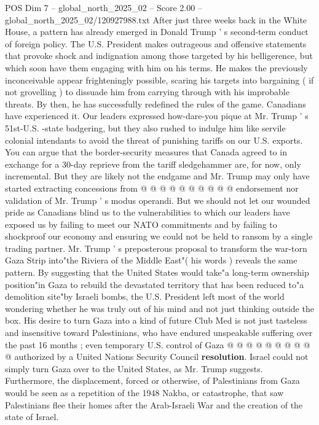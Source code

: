 \begin{textsample}{POS Dim 7 – global\_north\_2025\_02 – Score 2.00 – global\_north\_2025\_02/120927988.txt}  \label{ex:f7_pos_380}
After just three weeks back in the White House, a pattern has already emerged in Donald Trump ' s second-term conduct of foreign policy.
The U.S.
President makes outrageous and offensive statements that provoke shock and indignation among those targeted by his belligerence, but which soon have them engaging with him on his terms.
He makes the previously inconceivable appear frighteningly possible, scaring his targets into bargaining ( if not grovelling ) to dissuade him from carrying through with his improbable threats.
By then, he has successfully redefined the rules of the game.
Canadians have experienced it.
Our leaders expressed how-dare-you pique at Mr.
Trump ' s 51st-U.S. -state badgering, but they also rushed to indulge him like servile colonial intendants to avoid the threat of punishing tariffs on our U.S. exports.
You can argue that the border-security measures that Canada agreed to in exchange for a 30-day reprieve from the tariff sledgehammer are, for now, only incremental.
But they are likely not the endgame and Mr.
Trump may only have started extracting concessions from @ @ @ @ @ @ @ @ @ @ endorsement nor validation of Mr.
Trump ' s modus operandi.
But we should not let our wounded pride as Canadians blind us to the vulnerabilities to which our leaders have exposed us by failing to meet our NATO commitments and by failing to shockproof our economy and ensuring we could not be held to ransom by a single trading partner.
Mr.
Trump ' s preposterous proposal to transform the war-torn Gaza Strip into"the Riviera of the Middle East"( his words ) reveals the same pattern.
By suggesting that the United States would take"a long-term ownership position"in Gaza to rebuild the devastated territory that has been reduced to"a demolition site"by Israeli bombs, the U.S.
President left most of the world wondering whether he was truly out of his mind and not just thinking outside the box.
His desire to turn Gaza into a kind of future Club Med is not just tasteless and insensitive toward Palestinians, who have endured unspeakable suffering over the past 16 months ; even temporary U.S. control of Gaza @ @ @ @ @ @ @ @ @ @ authorized by a United Nations Security Council \textbf{resolution}.
Israel could not simply turn Gaza over to the United States, as Mr.
Trump suggests.
Furthermore, the displacement, forced or otherwise, of Palestinians from Gaza would be seen as a repetition of the 1948 Nakba, or catastrophe, that saw Palestinians flee their homes after the Arab-Israeli War and the creation of the state of Israel.

\end{textsample}
